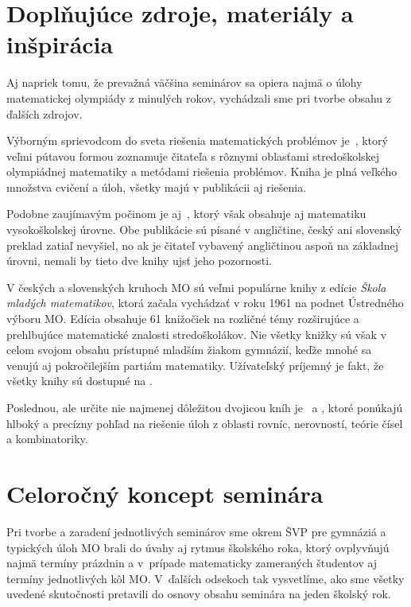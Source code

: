 \section{Doplňujúce zdroje, materiály a inšpirácia}

Aj napriek tomu, že prevažná väčšina seminárov sa opiera najmä o úlohy matematickej olympiády z minulých rokov, vychádzali sme pri tvorbe obsahu z ďalších zdrojov.

Výborným sprievodcom do sveta riešenia matematických problémov je~\cite{holton2010}, ktorý veľmi pútavou formou zoznamuje čitateľa s rôznymi oblasťami stredoškolskej olympiádnej matematiky a metódami riešenia problémov. Kniha je plná veľkého množstva cvičení a úloh, všetky majú v publikácii aj riešenia.

Podobne zaujímavým počinom je aj~\cite{zeitz2007}, ktorý však obsahuje aj matematiku vysokoškolskej úrovne. Obe publikácie sú písané v angličtine, český ani slovenský preklad zatiaľ nevyšiel, no ak je čitateľ vybavený angličtinou aspoň na základnej úrovni, nemali by tieto dve knihy ujsť jeho pozornosti.

V českých a slovenských kruhoch MO sú veľmi populárne knihy z edície \textit{Škola mladých matematikov}, ktorá začala vychádzať v roku 1961 na podnet Ústredného výboru MO. Edícia obsahuje 61 knižočiek na rozličné témy rozširujúce a prehlbujúce matematické znalosti stredoškolákov. Nie všetky knižky sú však v celom svojom obsahu prístupné mladším žiakom gymnázií, keďže mnohé sa venujú aj pokročilejším partiám matematiky. Užívateľský príjemný je fakt, že všetky knihy sú dostupné na .

Poslednou, ale určite nie najmenej dôležitou dvojicou kníh je~\cite{herman2004} a \cite{herman2011} , ktoré ponúkajú hlboký a precízny pohľad na riešenie úloh z oblasti rovníc, nerovností, teórie čísel a kombinatoriky.



\section{Celoročný koncept seminára}

Pri tvorbe a zaradení jednotlivých seminárov sme okrem ŠVP pre gymnáziá a typických úloh MO brali do úvahy aj rytmus školského roka, ktorý ovplyvňujú najmä termíny prázdnin a v~prípade matematicky zameraných študentov aj termíny jednotlivých kôl MO. V~ďalších odsekoch tak vysvetlíme, ako sme všetky uvedené skutočnosti pretavili do osnovy obsahu seminára na jeden školský rok.

